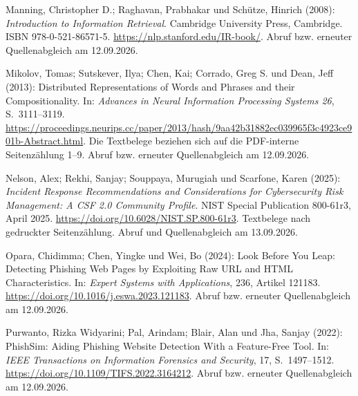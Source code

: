 \par\smallskip
\begin{samepage}
\noindent
Manning, Christopher D.; Raghavan, Prabhakar und Schütze, Hinrich (2008):
\textit{Introduction to Information Retrieval}.
Cambridge University Press, Cambridge.
ISBN 978-0-521-86571-5.
\url{https://nlp.stanford.edu/IR-book/}.
Abruf bzw. erneuter Quellenabgleich am 12.09.2026.
\par\end{samepage}
\par\smallskip
\begin{samepage}
\noindent
Mikolov, Tomas; Sutskever, Ilya; Chen, Kai; Corrado, Greg S. und Dean, Jeff (2013):
Distributed Representations of Words and Phrases and their Compositionality.
In: \textit{Advances in Neural Information Processing Systems 26},
S.~3111--3119.
\url{https://proceedings.neurips.cc/paper/2013/hash/9aa42b31882ec039965f3c4923ce901b-Abstract.html}.
Die Textbelege beziehen sich auf die PDF-interne Seitenzählung 1--9.
Abruf bzw. erneuter Quellenabgleich am 12.09.2026.
\par\end{samepage}
\par\smallskip
\begin{samepage}
\noindent
Nelson, Alex; Rekhi, Sanjay; Souppaya, Murugiah und Scarfone, Karen (2025):
\textit{Incident Response Recommendations and Considerations for Cybersecurity Risk Management:
A CSF 2.0 Community Profile}. NIST Special Publication 800-61r3, April 2025.
\url{https://doi.org/10.6028/NIST.SP.800-61r3}.
Textbelege nach gedruckter Seitenzählung. Abruf und Quellenabgleich am 13.09.2026.
\par\end{samepage}
\par\smallskip
\begin{samepage}
\noindent
Opara, Chidimma; Chen, Yingke und Wei, Bo (2024):
Look Before You Leap: Detecting Phishing Web Pages by Exploiting Raw URL and HTML Characteristics.
In: \textit{Expert Systems with Applications}, 236, Artikel 121183.
\url{https://doi.org/10.1016/j.eswa.2023.121183}.
Abruf bzw. erneuter Quellenabgleich am 12.09.2026.
\par\end{samepage}
\par\smallskip
\begin{samepage}
\noindent
Purwanto, Rizka Widyarini; Pal, Arindam; Blair, Alan und Jha, Sanjay (2022):
PhishSim: Aiding Phishing Website Detection With a Feature-Free Tool.
In: \textit{IEEE Transactions on Information Forensics and Security},
17, S.~1497--1512.
\url{https://doi.org/10.1109/TIFS.2022.3164212}.
Abruf bzw. erneuter Quellenabgleich am 12.09.2026.
\par\end{samepage}
